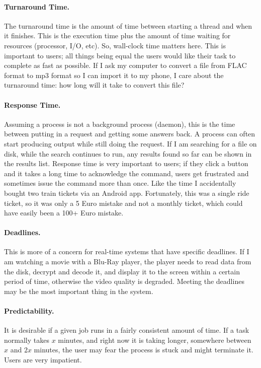\paragraph{Turnaround Time.} The turnaround time is the amount of time between starting a thread and when it finishes. This is the execution time plus the amount of time waiting for resources (processor, I/O, etc). So, wall-clock time matters here. This is important to users; all things being equal the users would like their task to complete as fast as possible. If I ask my computer to convert a file from FLAC format to mp3 format so I can import it to my phone, I care about the turnaround time: how long will it take to convert this file?

\paragraph{Response Time.} Assuming a process is not a background process (daemon), this is the time between putting in a request and getting some answers back. A process can often start producing output while still doing the request. If I am searching for a file on disk, while the search continues to run, any results found so far can be shown in the results list. Response time is very important to users; if they click a button and it takes a long time to acknowledge the command, users get frustrated and sometimes issue the command more than once. Like the time I accidentally bought two train tickets via an Android app. Fortunately, this was a single ride ticket, so it was only a 5 Euro mistake and not a monthly ticket, which could have easily been a 100+ Euro mistake.

\paragraph{Deadlines.} This is more of a concern for real-time systems that have specific deadlines. If I am watching a movie with a Blu-Ray player, the player needs to read data from the disk, decrypt and decode it, and display it to the screen within a certain period of time, otherwise the video quality is degraded. Meeting the deadlines may be the most important thing in the system.

\paragraph{Predictability.} It is desirable if a given job runs in a fairly consistent amount of time. If a task normally takes $x$ minutes, and right now it is taking longer, somewhere between $x$ and $2x$ minutes, the user may fear the process is stuck and might terminate it. Users are very impatient.

